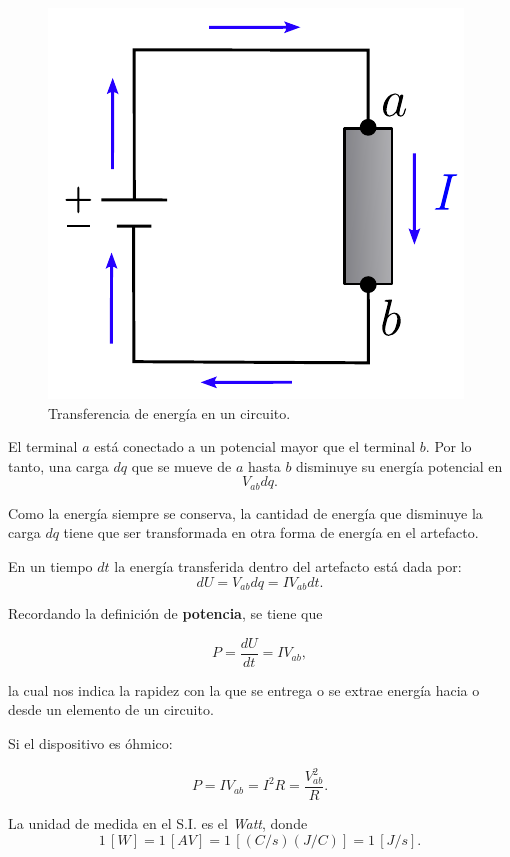 \begin{figure}[H]
    \centering
    \includegraphics[scale = 0.8]{Figuras/Energia-Circuito.pdf}
    \caption{Transferencia de energía en un circuito.}
    \label{fig:Energia-Circuito}
\end{figure}

El terminal $a$ está conectado a un potencial mayor que el terminal $b$. Por lo tanto, una carga $dq$ que se mueve de $a$ hasta $b$ disminuye su energía potencial en
$$V_{ab} dq.$$

Como la energía siempre se conserva, la cantidad de energía que disminuye la carga $dq$ tiene que ser transformada en otra forma de energía en el artefacto.

En un tiempo $dt$ la energía transferida dentro del artefacto está dada por:
$$dU = V_{ab} dq = I V_{ab} dt.$$

Recordando la definición de \textbf{potencia}, se tiene que
\begin{shaded}
    $$P = \frac{dU}{dt} = I V_{ab},$$
\end{shaded}

la cual nos indica la rapidez con la que se entrega o se extrae energía hacia o desde un elemento de un circuito.

Si el dispositivo es óhmico:
\begin{shaded}
 $$P = IV_{ab} = I^2R = \frac{V_{ab}^2}{R}.$$   
\end{shaded}

La unidad de medida en el S.I. es el \textit{Watt}, donde
$$1 \, [W] = 1 \,[A V] = 1 \, [(C/s)(J/C)] = 1\, [J/s].$$


